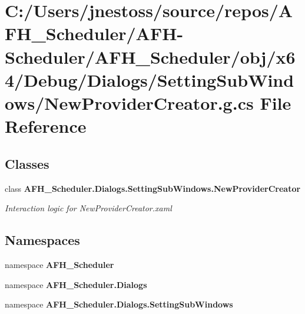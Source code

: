\section{C\+:/\+Users/jnestoss/source/repos/\+A\+F\+H\+\_\+\+Scheduler/\+A\+F\+H-\/\+Scheduler/\+A\+F\+H\+\_\+\+Scheduler/obj/x64/\+Debug/\+Dialogs/\+Setting\+Sub\+Windows/\+New\+Provider\+Creator.g.\+cs File Reference}
\label{x64_2_debug_2_dialogs_2_setting_sub_windows_2_new_provider_creator_8g_8cs}
\subsection*{Classes}
\begin{DoxyCompactItemize}
\item 
class \textbf{ A\+F\+H\+\_\+\+Scheduler.\+Dialogs.\+Setting\+Sub\+Windows.\+New\+Provider\+Creator}
\begin{DoxyCompactList}\small\item\em Interaction logic for New\+Provider\+Creator.\+xaml \end{DoxyCompactList}\end{DoxyCompactItemize}
\subsection*{Namespaces}
\begin{DoxyCompactItemize}
\item 
namespace \textbf{ A\+F\+H\+\_\+\+Scheduler}
\item 
namespace \textbf{ A\+F\+H\+\_\+\+Scheduler.\+Dialogs}
\item 
namespace \textbf{ A\+F\+H\+\_\+\+Scheduler.\+Dialogs.\+Setting\+Sub\+Windows}
\end{DoxyCompactItemize}
